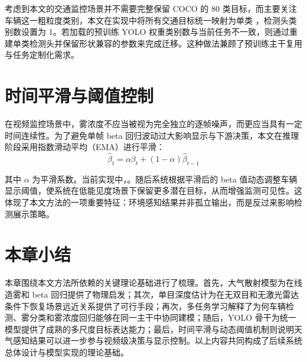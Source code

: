 考虑到本文的交通监控场景并不需要完整保留 COCO 的 80 类目标，而主要关注车辆这一粗粒度类别，本文在实现中将所有交通目标统一映射为单类 ，检测头类别数设置为 1。若加载的预训练 YOLO 权重类别数与当前任务不一致，则通过重建单类检测头并保留形状兼容的参数来完成迁移。这种做法兼顾了预训练主干复用与任务定制化需求\cite{ultralyticsDocs}。

\section{时间平滑与阈值控制}

在视频监控场景中，雾浓度不应当被视为完全独立的逐帧噪声，而更应当具有一定时间连续性。为了避免单帧 beta 回归波动过大影响显示与下游决策，本文在推理阶段采用指数滑动平均（EMA）进行平滑：
\begin{equation}
\hat{\beta}_{t}=\alpha \beta_t+(1-\alpha)\hat{\beta}_{t-1}
\end{equation}

其中 \(\alpha\) 为平滑系数。当前实现中，。随后系统根据平滑后的 beta 值动态调整车辆显示阈值，使系统在低能见度场景下保留更多潜在目标，从而增强监测可见性。这体现了本文方法的一项重要特征：环境感知结果并非孤立输出，而是反过来影响检测展示策略。

\section{本章小结}

本章围绕本文方法所依赖的关键理论基础进行了梳理。首先，大气散射模型为在线造雾和 beta 回归提供了物理启发；其次，单目深度估计为在无双目和无激光雷达条件下恢复场景远近关系提供了可行手段；再次，多任务学习解释了为何车辆检测、雾分类和雾浓度回归能够在同一主干中协同建模；随后，YOLO 骨干为统一模型提供了成熟的多尺度目标表达能力；最后，时间平滑与动态阈值机制则说明天气感知结果可以进一步参与视频级决策与显示控制。以上内容共同构成了后续系统总体设计与模型实现的理论基础。
